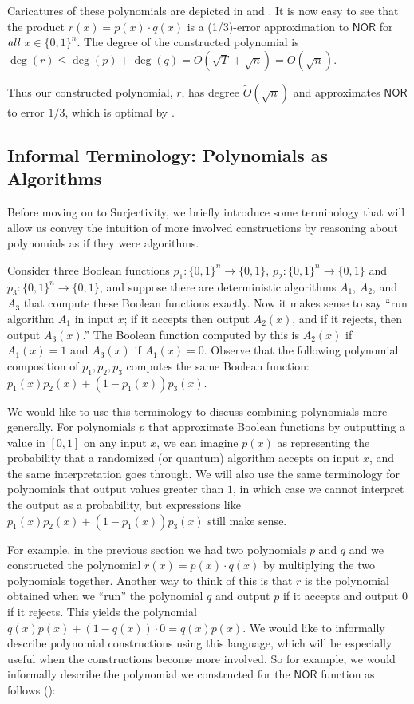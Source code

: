 \documentclass[11pt, letterpaper, fleqn]{article}
\theoremstyle{plain}
\newcommand{\Surjectivity}{Surjectivity}
\newcommand{\NOR}{\mathsf{ NOR}}
\newcommand{\B}{\{0,1\}}
\newcommand{\tO}{\tilde{O}}
\begin{document}
Caricatures of these polynomials are depicted in  and . It is now easy to see that the product $r(x)=p(x)\cdot q(x)$ is a (1/3)-error approximation to $\NOR$ for $\emph{all}$ $x \in \B^n$. 
The degree of the constructed polynomial is $\deg(r) \leq \deg(p) + \deg(q) = \tO(\sqrt{T}+\sqrt{n}) = \tO(\sqrt{n})$. 

Thus our constructed polynomial, $r$, has degree $\tO(\sqrt{n})$ and approximates $\NOR$ to error $1/3$, which is optimal by . 




\label{s:strategy}

\subsection{Informal Terminology: Polynomials as Algorithms}
\label{s:terminology}
Before moving on to \Surjectivity, we briefly introduce some terminology that will allow us convey the intuition of more involved constructions by reasoning about polynomials as if they were algorithms. 

Consider three Boolean functions $p_1:\B^n\to\B$, $p_2:\B^n\to\B$ and $p_3:\B^n\to\B$, and suppose there are deterministic algorithms $A_1$, $A_2$, and $A_3$ that compute these Boolean functions exactly. Now it makes sense to say ``run algorithm $A_1$ in input $x$; if it accepts then output $A_2(x)$, and if it rejects, then output $A_3(x)$.'' The Boolean function computed by this is $A_2(x)$ if $A_1(x)=1$ and $A_3(x)$ if $A_1(x)=0$. Observe that the following polynomial composition of $p_1, p_2, p_3$ computes the same Boolean function: $p_1(x)p_2(x) + (1-p_1(x))p_3(x)$.

We would like to use this terminology to discuss combining polynomials more generally. For polynomials $p$ that approximate Boolean functions by outputting a value in $[0,1]$ on any input $x$, we can imagine $p(x)$ as representing the probability that a randomized (or quantum) algorithm accepts on input $x$, and the same interpretation goes through. We will also use the same terminology for polynomials that output values greater than $1$, in which case we cannot interpret the output as a probability, but expressions like $p_1(x)p_2(x) + (1-p_1(x))p_3(x)$ still make sense.

For example, in the previous section we had two polynomials $p$ and $q$ and we constructed the polynomial $r(x)=p(x) \cdot q(x)$ by multiplying the two polynomials together. 
Another way to think of this is that $r$ is the polynomial obtained when we ``run'' the polynomial $q$ and output $p$ if it accepts and output $0$ if it rejects. 
This yields the polynomial $q(x)p(x) + (1-q(x)) \cdot 0 = q(x)p(x)$. 
We would like to informally describe polynomial constructions using this language, which will be especially useful when the constructions become more involved. So for example, we would informally describe the polynomial we constructed for the $\NOR$ function as follows (): 
\end{document}
